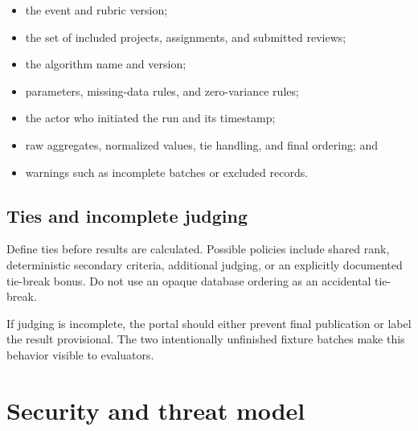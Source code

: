 \begin{itemize}
  \item the event and rubric version;
  \item the set of included projects, assignments, and submitted reviews;
  \item the algorithm name and version;
  \item parameters, missing-data rules, and zero-variance rules;
  \item the actor who initiated the run and its timestamp;
  \item raw aggregates, normalized values, tie handling, and final ordering; and
  \item warnings such as incomplete batches or excluded records.
\end{itemize}

\subsection{Ties and incomplete judging}

Define ties before results are calculated. Possible policies include shared rank, deterministic secondary criteria, additional judging, or an explicitly documented tie-break bonus. Do not use an opaque database ordering as an accidental tie-break.

If judging is incomplete, the portal should either prevent final publication or label the result provisional. The two intentionally unfinished fixture batches make this behavior visible to evaluators.

\section{Security and threat model}

\advisory\par


